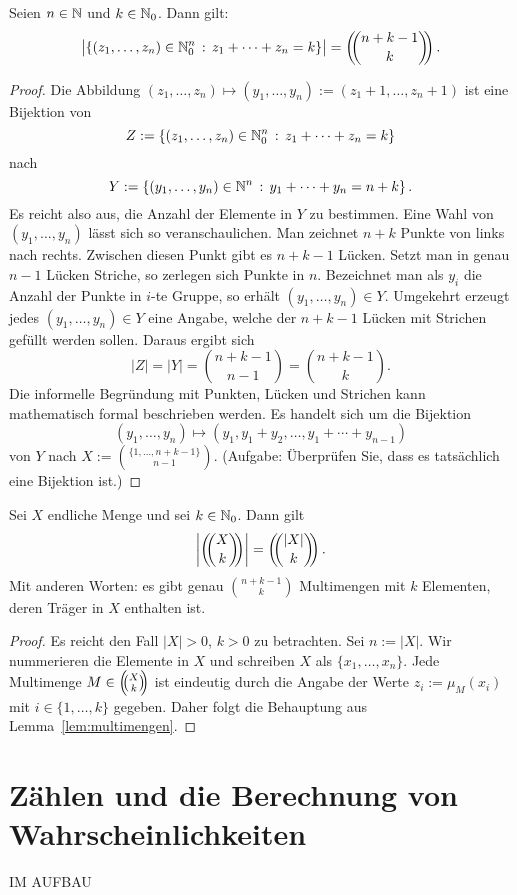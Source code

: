 \begin{lem} \label{lem:multimengen}
	Seien $n \in \mathbb{N}$ und $k \in \mathbb{N}_0$. Dann gilt: 
	\[
		\bigl| \left\{  (z_1,\ldots,z_n) \in \mathbb{N}_0^n \,:\, z_1 + \cdots + z_n = k \right\} \bigr| = \left(\!\!\binom{n+k-1}{k}\!\!\right). 
	\]
\end{lem} 
\begin{proof} 
	Die Abbildung $(z_1,\ldots,z_n) \mapsto (y_1,\ldots,y_n):=(z_1+1,\ldots,z_n+1)$ ist eine Bijektion von 
	\[
			Z:=\left\{  (z_1,\ldots,z_n) \in \mathbb{N}_0^n \,:\, z_1 + \cdots + z_n = k \right\}
	\]
	nach 
	\[
			Y:= \left\{  (y_1,\ldots,y_n) \in \mathbb{N}^n \,:\, y_1 + \cdots + y_n = n+ k \right\}. 
	\]
	Es reicht also aus, die Anzahl der Elemente in $Y$ zu bestimmen. Eine Wahl von $(y_1,\ldots,y_n)$ lässt sich so veranschaulichen. Man zeichnet $n+k$ Punkte von links nach rechts. Zwischen diesen Punkt gibt es $n+k-1$ Lücken. Setzt man in genau $n-1$ Lücken Striche, so zerlegen sich Punkte in $n$. Bezeichnet man als $y_i$ die Anzahl der Punkte in $i$-te Gruppe, so erhält $(y_1,\ldots,y_n) \in Y$. Umgekehrt erzeugt jedes $(y_1,\ldots,y_n) \in Y$ eine Angabe, welche der $n+k-1$ Lücken mit Strichen gefüllt werden sollen. Daraus ergibt sich 
	\[
			|Z| = |Y|= \binom{n+k-1}{n-1} = \binom{n+k-1}{k}. 
	\]
	Die informelle Begründung mit Punkten, Lücken und Strichen kann mathematisch formal beschrieben werden. Es handelt sich um die Bijektion 
	\[
		(y_1,\ldots,y_n) \mapsto (y_1,y_1+y_2,\ldots, y_1+ \cdots +y_{n-1})
	\] von $Y$ nach 
	\(
			X:=\binom{\{1,\ldots,n+k-1\}}{n-1}. 
	\)
	(Aufgabe: Überprüfen Sie, dass es tatsächlich eine Bijektion ist.) 
\end{proof} 

\begin{thm}
	Sei $X$ endliche Menge und sei $k \in \mathbb{N}_0$. Dann gilt 
	\[
			\left| \mbinom{X}{k} \right| = \mbinom{|X|}{k}. 
	\]
	Mit anderen Worten: es gibt genau $\binom{n+k-1}{k}$ Multimengen mit $k$ Elementen, deren Träger in $X$ enthalten ist. 
\end{thm}
\begin{proof}
	Es reicht den Fall $|X| >0$, $k>0$ zu betrachten. Sei $n:= |X|$. Wir nummerieren die Elemente in $X$ und schreiben $X$ als $\{x_1,\ldots,x_n\}$. Jede Multimenge $M \in \left(\!\!\binom{X}{k}\!\!\right)$ ist eindeutig durch die Angabe der Werte $z_i := \mu_M(x_i)$ mit $i \in \{1,\ldots,k\}$ gegeben. Daher folgt die Behauptung aus Lemma~\ref{lem:multimengen}. 
\end{proof} 

\section{Zählen und die Berechnung von Wahrscheinlichkeiten} 

IM AUFBAU 